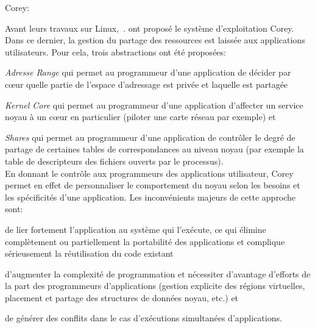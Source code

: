       \begin{paragraph}{Corey:}

        Avant leurs travaux sur Linux,~\citet{boyd2008corey}. ont proposé le
        système d’exploitation Corey. Dans ce dernier, la gestion du partage des
        ressources est laissée aux applications utilisateurs. Pour cela, trois
        abstractions ont été proposées: \benumline \item \textit{Adresse Range}
        qui permet au programmeur d’une application de décider par c\oe ur
        quelle partie de l’espace d’adressage est privée et laquelle est
        partagée \item \textit{Kernel Core} qui permet au programmeur d’une
        application d’affecter un service noyau à un c\oe ur en particulier
        (piloter une carte réseau par exemple) et \item \textit{Shares} qui
        permet au programmeur d’une application de contrôler le degré de partage
        de certaines tables de correspondances au niveau noyau (par exemple la
        table de descripteurs des fichiers ouverts par le
        processus)\eenumline.\\

        En donnant le contrôle aux programmeurs des applications utilisateur,
        Corey permet en effet de personnaliser le comportement du noyau selon
        les besoins et les spécificités d’une application. Les inconvénients
        majeurs de cette approche sont: \benumline \item de lier fortement
        l’application au système qui l’exécute, ce qui élimine complètement ou
        partiellement la portabilité des applications et complique sérieusement
        la réutilisation du code existant \item d'augmenter la complexité de
        programmation et nécessiter d’avantage d’efforts de la part des
        programmeurs d’applications (gestion explicite des régions virtuelles,
        placement et partage des structures de données noyau, etc.) et \item de
        générer des conflits dans le cas d'exécutions simultanées
        d'applications\eenumline.

      \end{paragraph}

